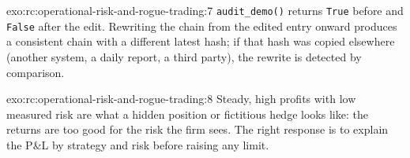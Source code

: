 \begin{solution}{exo:rc:operational-risk-and-rogue-trading:7}
\texttt{audit\_demo()} returns \texttt{True} before and \texttt{False} after the edit. Rewriting the chain
from the edited entry onward produces a consistent chain with a different latest hash; if that hash was
copied elsewhere (another system, a daily report, a third party), the rewrite is detected by comparison.
\end{solution}

\begin{solution}{exo:rc:operational-risk-and-rogue-trading:8}
Steady, high profits with low measured risk are what a hidden position or fictitious hedge looks like:
the returns are too good for the risk the firm sees. The right response is to explain the P\&L by strategy and risk before raising any limit.
\end{solution}

